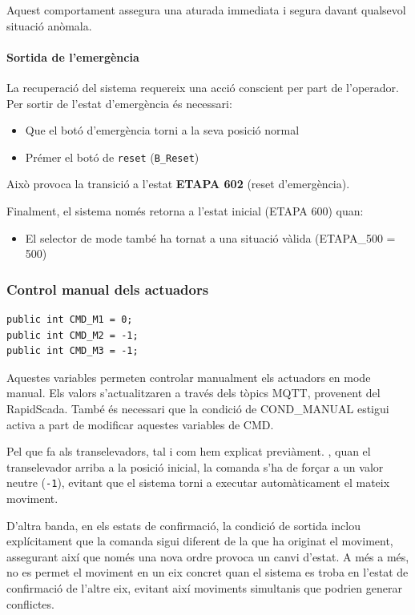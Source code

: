 \documentclass[a4paper,11pt,DIV=13,headings=normal,abstract=true,twoside=semi]{article}
\begin{document}
Aquest comportament assegura una aturada immediata i segura davant qualsevol situació anòmala.

\paragraph{Sortida de l'emergència}

La recuperació del sistema requereix una acció conscient per part de l'operador. Per sortir de l'estat d'emergència és necessari:

\begin{itemize}
\item Que el botó d'emergència torni a la seva posició normal
\item Prémer el botó de \texttt{reset} (\texttt{B\_Reset})
\end{itemize}

Això provoca la transició a l'estat \textbf{ETAPA 602} (reset d'emergència).

Finalment, el sistema només retorna a l'estat inicial (ETAPA 600) quan:
\begin{itemize}
\item El selector de mode també ha tornat a una situació vàlida (ETAPA\_500 = 500)
\end{itemize}

\subsubsection*{Control manual dels actuadors}

\begin{lstlisting}[style=simple]
public int CMD_M1 = 0;
public int CMD_M2 = -1;
public int CMD_M3 = -1;
\end{lstlisting}

Aquestes variables permeten controlar manualment els actuadors en mode manual. Els valors s'actualitzaren a través dels tòpics MQTT, provenent del RapidScada. També és necessari que la condició de COND\_MANUAL estigui activa a part de modificar aquestes variables de CMD. 

Pel que fa als transelevadors, tal i com hem explicat previàment. , quan el transelevador arriba a la posició inicial, la comanda s'ha de forçar a un valor neutre (\texttt{-1}), evitant que el sistema torni a executar automàticament el mateix moviment.

D'altra banda, en els estats de confirmació, la condició de sortida inclou explícitament que la comanda sigui diferent de la que ha originat el moviment, assegurant així que només una nova ordre provoca un canvi d'estat. A més a més, no es permet el moviment en un eix concret quan el sistema es troba en l'estat de confirmació de l'altre eix, evitant així moviments simultanis que podrien generar conflictes.
\end{document}

